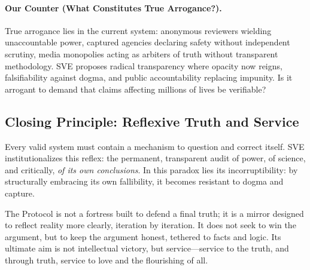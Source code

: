 \paragraph{\textbf{Our Counter (What Constitutes True Arrogance?).}} True arrogance lies in the current system: anonymous reviewers wielding unaccountable power, captured agencies declaring safety without independent scrutiny, media monopolies acting as arbiters of truth without transparent methodology. SVE proposes radical transparency where opacity now reigns, falsifiability against dogma, and public accountability replacing impunity. Is it arrogant to demand that claims affecting millions of lives be verifiable?

\vspace{1.5em}

\subsection*{\textcolor{headercolor}{Closing Principle: Reflexive Truth and Service}}

Every valid system must contain a mechanism to question and correct itself. SVE institutionalizes this reflex: the permanent, transparent audit of power, of science, and critically, \textit{of its own conclusions}. In this paradox lies its incorruptibility: by structurally embracing its own fallibility, it becomes resistant to dogma and capture.

The Protocol is not a fortress built to defend a final truth; it is a mirror designed to reflect reality more clearly, iteration by iteration. It does not seek to win the argument, but to keep the argument honest, tethered to facts and logic. Its ultimate aim is not intellectual victory, but service—service to the truth, and through truth, service to love and the flourishing of all.

\vspace{2em}

